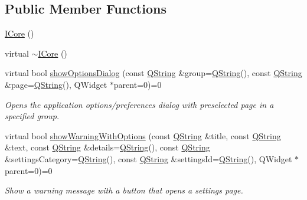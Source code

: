 \subsection*{\-Public \-Member \-Functions}
\begin{DoxyCompactItemize}
\item 
\hyperlink{group___core_plugin_gaf7b8469fbd85a1bb1b7f0248054bdf64}{\-I\-Core} ()
\item 
virtual \hyperlink{group___core_plugin_ga6c02c9e9d4fb7ae94c07d3e4fc6f3696}{$\sim$\-I\-Core} ()
\item 
virtual bool \hyperlink{group___core_plugin_ga36e6d97f61e59bd4ac1d5c1b223d17bc}{show\-Options\-Dialog} (const \hyperlink{group___u_a_v_objects_plugin_gab9d252f49c333c94a72f97ce3105a32d}{\-Q\-String} \&group=\hyperlink{group___u_a_v_objects_plugin_gab9d252f49c333c94a72f97ce3105a32d}{\-Q\-String}(), const \hyperlink{group___u_a_v_objects_plugin_gab9d252f49c333c94a72f97ce3105a32d}{\-Q\-String} \&page=\hyperlink{group___u_a_v_objects_plugin_gab9d252f49c333c94a72f97ce3105a32d}{\-Q\-String}(), \-Q\-Widget $\ast$parent=0)=0
\begin{DoxyCompactList}\small\item\em \-Opens the application options/preferences dialog with preselected {\itshape page\/} in a specified {\itshape group\/}. \end{DoxyCompactList}\item 
virtual bool \hyperlink{group___core_plugin_gad71cbf26d3f4d8a8e2fca464d1cc9695}{show\-Warning\-With\-Options} (const \hyperlink{group___u_a_v_objects_plugin_gab9d252f49c333c94a72f97ce3105a32d}{\-Q\-String} \&title, const \hyperlink{group___u_a_v_objects_plugin_gab9d252f49c333c94a72f97ce3105a32d}{\-Q\-String} \&text, const \hyperlink{group___u_a_v_objects_plugin_gab9d252f49c333c94a72f97ce3105a32d}{\-Q\-String} \&details=\hyperlink{group___u_a_v_objects_plugin_gab9d252f49c333c94a72f97ce3105a32d}{\-Q\-String}(), const \hyperlink{group___u_a_v_objects_plugin_gab9d252f49c333c94a72f97ce3105a32d}{\-Q\-String} \&settings\-Category=\hyperlink{group___u_a_v_objects_plugin_gab9d252f49c333c94a72f97ce3105a32d}{\-Q\-String}(), const \hyperlink{group___u_a_v_objects_plugin_gab9d252f49c333c94a72f97ce3105a32d}{\-Q\-String} \&settings\-Id=\hyperlink{group___u_a_v_objects_plugin_gab9d252f49c333c94a72f97ce3105a32d}{\-Q\-String}(), \-Q\-Widget $\ast$parent=0)=0
\begin{DoxyCompactList}\small\item\em \-Show a warning message with a button that opens a settings page. \end{DoxyCompactList}\item 

\end{DoxyCompactItemize}
